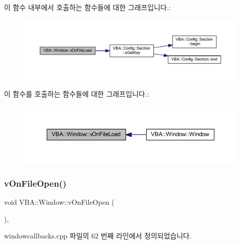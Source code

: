 이 함수 내부에서 호출하는 함수들에 대한 그래프입니다.\+:
\nopagebreak
\begin{figure}[H]
\begin{center}
\leavevmode
\includegraphics[width=350pt]{class_v_b_a_1_1_window_a74bd51bc1e0e699d5523ad7828031394_cgraph}
\end{center}
\end{figure}
이 함수를 호출하는 함수들에 대한 그래프입니다.\+:
\nopagebreak
\begin{figure}[H]
\begin{center}
\leavevmode
\includegraphics[width=350pt]{class_v_b_a_1_1_window_a74bd51bc1e0e699d5523ad7828031394_icgraph}
\end{center}
\end{figure}
\mbox{\label{class_v_b_a_1_1_window_a8495a133642f2f0428d9487c86c8a231}} 
\subsubsection{\texorpdfstring{v\+On\+File\+Open()}{vOnFileOpen()}}
{\footnotesize\ttfamily void V\+B\+A\+::\+Window\+::v\+On\+File\+Open (\begin{DoxyParamCaption}{ }\end{DoxyParamCaption})\hspace{0.3cm}{\ttfamily [protected]}, {\ttfamily [virtual]}}



windowcallbacks.\+cpp 파일의 62 번째 라인에서 정의되었습니다.


